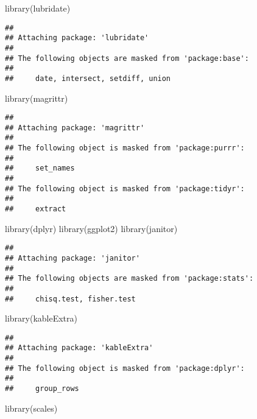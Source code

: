 \documentclass[
]{article}
\newenvironment{Shaded}{\begin{snugshade}}{\end{snugshade}}
\newcommand{\FunctionTok}[1]{\textcolor[rgb]{0.00,0.00,0.00}{#1}}
\newcommand{\NormalTok}[1]{#1}
\begin{document}
\begin{Shaded}
\begin{Highlighting}[]
\FunctionTok{library}\NormalTok{(lubridate)}
\end{Highlighting}
\end{Shaded}

\begin{verbatim}
## 
## Attaching package: 'lubridate'
## 
## The following objects are masked from 'package:base':
## 
##     date, intersect, setdiff, union
\end{verbatim}

\begin{Shaded}
\begin{Highlighting}[]
\FunctionTok{library}\NormalTok{(magrittr)}
\end{Highlighting}
\end{Shaded}

\begin{verbatim}
## 
## Attaching package: 'magrittr'
## 
## The following object is masked from 'package:purrr':
## 
##     set_names
## 
## The following object is masked from 'package:tidyr':
## 
##     extract
\end{verbatim}

\begin{Shaded}
\begin{Highlighting}[]
\FunctionTok{library}\NormalTok{(dplyr)}
\FunctionTok{library}\NormalTok{(ggplot2)}
\FunctionTok{library}\NormalTok{(janitor)}
\end{Highlighting}
\end{Shaded}

\begin{verbatim}
## 
## Attaching package: 'janitor'
## 
## The following objects are masked from 'package:stats':
## 
##     chisq.test, fisher.test
\end{verbatim}

\begin{Shaded}
\begin{Highlighting}[]
\FunctionTok{library}\NormalTok{(kableExtra)}
\end{Highlighting}
\end{Shaded}

\begin{verbatim}
## 
## Attaching package: 'kableExtra'
## 
## The following object is masked from 'package:dplyr':
## 
##     group_rows
\end{verbatim}

\begin{Shaded}
\begin{Highlighting}[]
\FunctionTok{library}\NormalTok{(scales)}
\end{Highlighting}
\end{Shaded}
\end{document}

